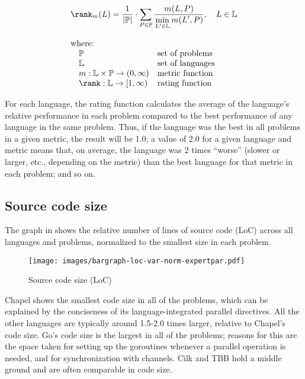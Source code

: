 \vspace{-2ex}
\begin{displaymath}
  \begin{array}{ll}
  \multicolumn{2}{c}{\displaystyle
  \rank_m(L) = \frac{1}{|\mathbb{P}|} \cdot \displaystyle \sum_{P \in \mathbb{P}} \dfrac{\displaystyle m(L, P)}{\displaystyle \min_{L' \in \mathbb{L}} m(L', P)}, \quad L \in \mathbb{L}}\\ \\
  \text{where:} \\
  \quad \mathbb{P} & \text{set of problems} \\
  \quad \mathbb{L} & \text{set of languages} \\
  \quad m: \mathbb{L} \times \mathbb{P} \rightarrow (0, \infty) & \text{metric function} \\
  \quad \rank: \mathbb{L} \rightarrow [1, \infty) & \text{rating function} \\
  \end{array}
  \label{eq:agg}
\end{displaymath}

For each language, the rating function calculates the average of the language's relative performance in each problem compared to the best performance of any language in the same problem. Thus, if the language was the best in all problems in a given metric, the result will be 1.0; a value of 2.0 for a given language and metric means that, on average, the language was 2 times ``worse'' (slower or larger, etc., depending on the metric) than the best language for that metric in each problem; and so on.

\subsection{Source code size}
\label{sec:source-code-size}

The graph in  shows the relative number of lines of source code (LoC) across all languages and problems, normalized to the smallest size in each problem.

\begin{figure}[htbp]
  \centering
  \texttt{[image: images/bargraph-loc-var-norm-expertpar.pdf]}
  \caption{Source code size (LoC)}
  \label{fig:loc}
\end{figure}

Chapel shows the smallest code size in all of the problems, which can be explained by the conciseness of its language-integrated parallel directives. All the other languages are typically around 1.5-2.0 times larger, relative to Chapel's code size. Go's code size is the largest in all of the problems; reasons for this are the space taken for setting up the goroutines whenever a parallel operation is needed, and for synchronization with channels. Cilk and TBB hold a middle ground and are often comparable in code size.

